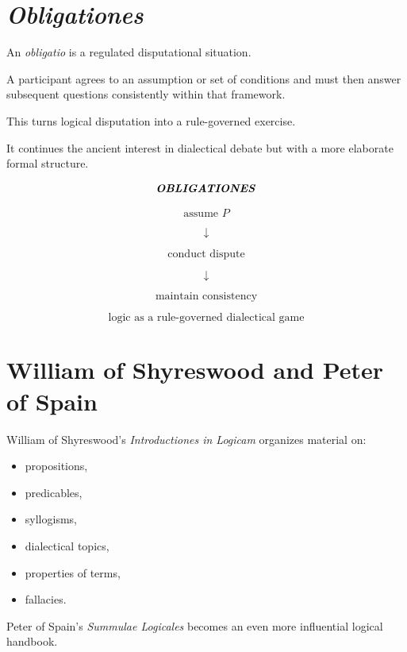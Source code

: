 \documentclass[11pt]{article}
\newcommand{\latin}[1]{\textit{#1}}
\begin{document}
\section{\textit{Obligationes}}

An \latin{obligatio} is a regulated disputational situation.

A participant agrees to an assumption or set of conditions and
must then answer subsequent questions consistently within that
framework.

This turns logical disputation into a rule-governed exercise.

It continues the ancient interest in dialectical debate but with a
more elaborate formal structure.

\begin{whiteboard}
\[
\textbf{\latin{OBLIGATIONES}}
\]

\[
\text{assume }P
\]

\[
\downarrow
\]

\[
\text{conduct dispute}
\]

\[
\downarrow
\]

\[
\text{maintain consistency}
\]

\[
\boxed{\text{logic as a rule-governed dialectical game}}
\]
\end{whiteboard}

\section{William of Shyreswood and Peter of Spain}

William of Shyreswood's \textit{Introductiones in Logicam}
organizes material on:

\begin{itemize}
    \item propositions,
    \item predicables,
    \item syllogisms,
    \item dialectical topics,
    \item properties of terms,
    \item fallacies.
\end{itemize}

Peter of Spain's \textit{Summulae Logicales} becomes an even more
influential logical handbook.
\end{document}
